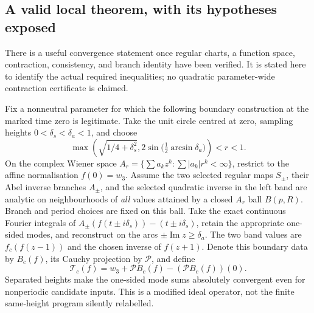 \documentclass[11pt]{article}
\newcommand{\im}{\operatorname{Im}}
\begin{document}
\subsection*{A valid local theorem, with its hypotheses exposed}
There is a useful convergence statement once regular charts, a function
space, contraction, consistency, and branch identity have been verified.
It is stated here to identify the actual required inequalities; no
quadratic parameter-wide contraction certificate is claimed.

Fix a nonneutral parameter for which the following boundary construction
at the marked time zero is legitimate. Take the unit circle centred at zero,
sampling heights $0<\delta_s<\delta_a<1$, and choose
\[
 \max\left(\sqrt{1/4+\delta_s^2},
  2\sin\bigl(\tfrac12\arcsin\delta_a\bigr)\right)<r<1.
\]
On the complex Wiener space
$A_r=\{\sum a_kz^k:\sum|a_k|r^k<\infty\}$,
restrict to the affine normalisation $f(0)=w_3$.
Assume the two selected regular maps $S_\pm$, their Abel inverse
branches $A_\pm$, and the selected quadratic inverse in the left band
are analytic on neighbourhoods of \emph{all} values attained by a
closed $A_r$ ball $B(p,R)$. Branch and period choices are fixed on
this ball. Take the exact continuous Fourier integrals of
$A_\pm(f(t\pm i\delta_s))-(t\pm i\delta_s)$, retain the appropriate
one-sided modes, and reconstruct on the arcs
$\pm\im z\ge\delta_a$. The two band values are
$f_c(f(z-1))$ and the chosen inverse of $f(z+1)$.
Denote this boundary data by $B_c(f)$, its Cauchy projection by
$\mathcal P$, and define
\[
 \mathcal T_c(f)=w_3+\mathcal P B_c(f)
                         -(\mathcal P B_c(f))(0).
\]
Separated heights make the one-sided mode sums absolutely convergent
even for nonperiodic candidate inputs. This is a modified ideal operator,
not the finite same-height program silently relabelled.
\end{document}

